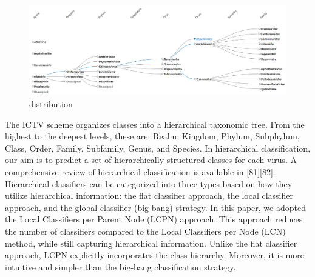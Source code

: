 \begin{figure}[t]
\begin{centering}
		\includegraphics[width=.48\textwidth]{Figures/heirarchy_IVT.png}
	\caption{distribution  }
\label{fig:distr}
\end{centering}
\end{figure}

The ICTV scheme organizes classes into a hierarchical taxonomic tree. From the highest to the deepest levels, these are: Realm, Kingdom, Phylum, Subphylum, Class, Order, Family, Subfamily, Genus, and Species. In hierarchical classification, our aim is to predict a set of hierarchically structured classes for each virus. A comprehensive review of hierarchical classification is available in [81][82]. Hierarchical classifiers can be categorized into three types based on how they utilize hierarchical information: the flat classifier approach, the local classifier approach, and the global classifier (big-bang) strategy. In this paper, we adopted the Local Classifiers per Parent Node (LCPN) approach. This approach reduces the number of classifiers compared to the Local Classifiers per Node (LCN) method, while still capturing hierarchical information. Unlike the flat classifier approach, LCPN explicitly incorporates the class hierarchy. Moreover, it is more intuitive and simpler than the big-bang classification strategy.










